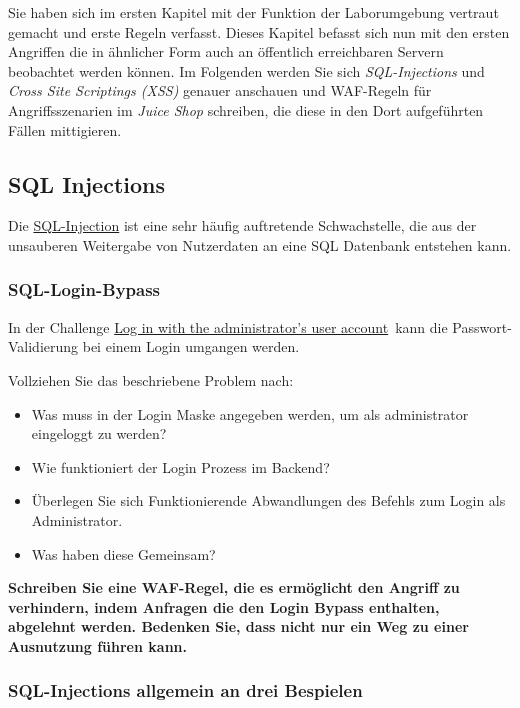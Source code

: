 Sie haben sich im ersten Kapitel mit der Funktion der Laborumgebung vertraut gemacht und erste Regeln verfasst.
Dieses Kapitel befasst sich nun mit den ersten Angriffen die in ähnlicher Form auch an öffentlich erreichbaren Servern beobachtet werden können.
Im Folgenden werden Sie sich \textit{SQL-Injections} und \textit{Cross Site Scriptings (XSS)} genauer anschauen und WAF-Regeln für Angriffsszenarien im \textit{Juice Shop} schreiben, die diese in den Dort aufgeführten Fällen mittigieren.

\subsection{SQL Injections}
Die \href{https://portswigger.net/web-security/sql-injection/cheat-sheet}{SQL-Injection} ist eine sehr häufig auftretende Schwachstelle, die aus der unsauberen Weitergabe von Nutzerdaten an eine SQL Datenbank entstehen kann.

\subsubsection{SQL-Login-Bypass}
In der Challenge \glqq\href{https://pwning.owasp-juice.shop/companion-guide/latest/part2/injection.html#_log_in_with_the_administrators_user_account}{Log in with the administrator’s user account}\grqq\ kann die Passwort-Validierung bei einem Login umgangen werden.

Vollziehen Sie das beschriebene Problem nach:
\begin{itemize}
    \item Was muss in der Login Maske angegeben werden, um als administrator eingeloggt zu werden?
    \item Wie funktioniert der Login Prozess im Backend?
    \item Überlegen Sie sich Funktionierende Abwandlungen des Befehls zum Login als Administrator.
    \item Was haben diese Gemeinsam?
\end{itemize}

\textbf{Schreiben Sie eine WAF-Regel, die es ermöglicht den Angriff zu verhindern, indem Anfragen die den Login Bypass enthalten, abgelehnt werden.
Bedenken Sie, dass nicht nur ein Weg zu einer Ausnutzung führen kann.}

\subsubsection{SQL-Injections allgemein an drei Bespielen}

